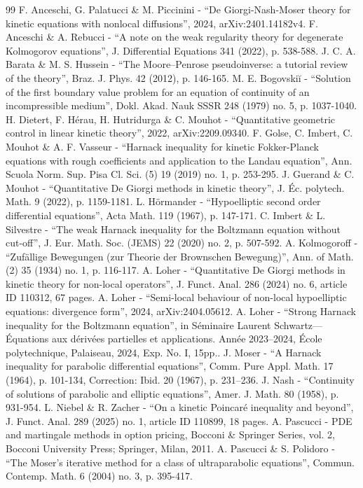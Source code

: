 \documentclass[10pt,a4paper]{amsart}
\theoremstyle{definition}
\begin{document}
\begin{thebibliography}{99}
 F. Anceschi, G. Palatucci \& M. Piccinini - “De Giorgi-Nash-Moser theory for kinetic equations with nonlocal diffusions”, 2024, arXiv:2401.14182v4.
 F. Anceschi \& A. Rebucci - “A note on the weak regularity theory for degenerate Kolmogorov equations”, J. Differential Equations 341 (2022), p. 538-588.
 J. C. A. Barata \& M. S. Hussein - “The Moore–Penrose pseudoinverse: a tutorial review of the theory”, Braz. J. Phys. 42 (2012), p. 146-165.
 M. E. Bogovskiĭ - “Solution of the first boundary value problem for an equation of continuity of an incompressible medium”, Dokl. Akad. Nauk SSSR 248 (1979) no. 5, p. 1037-1040.
 H. Dietert, F. Hérau, H. Hutridurga \& C. Mouhot - “Quantitative geometric control in linear kinetic theory”, 2022, arXiv:2209.09340.
 F. Golse, C. Imbert, C. Mouhot \& A. F. Vasseur - “Harnack inequality for kinetic Fokker-Planck equations with rough coefficients and application to the Landau equation”, Ann. Scuola Norm. Sup. Pisa Cl. Sci. (5) 19 (2019) no. 1, p. 253-295.
 J. Guerand \& C. Mouhot - “Quantitative De Giorgi methods in kinetic theory”, J. Éc. polytech. Math. 9 (2022), p. 1159-1181.
 L. Hörmander - “Hypoelliptic second order differential equations”, Acta Math. 119 (1967), p. 147-171.
 C. Imbert \& L. Silvestre - “The weak Harnack inequality for the Boltzmann equation without cut-off”, J. Eur. Math. Soc. (JEMS) 22 (2020) no. 2, p. 507-592.
 A. Kolmogoroff - “Zufällige Bewegungen (zur Theorie der Brownschen Bewegung)”, Ann. of Math. (2) 35 (1934) no. 1, p. 116-117.
 A. Loher - “Quantitative De Giorgi methods in kinetic theory for non-local operators”, J. Funct. Anal. 286 (2024) no. 6, article ID 110312, 67 pages.
 A. Loher - “Semi-local behaviour of non-local hypoelliptic equations: divergence form”, 2024, arXiv:2404.05612.
 A. Loher - “Strong Harnack inequality for the Boltzmann equation”, in Séminaire Laurent Schwartz—Équations aux dérivées partielles et applications. Année 2023–2024, École polytechnique, Palaiseau, 2024, Exp. No. I, 15pp..
 J. Moser - “A Harnack inequality for parabolic differential equations”, Comm. Pure Appl. Math. 17 (1964), p. 101-134, Correction: Ibid. 20 (1967), p. 231–236.
 J. Nash - “Continuity of solutions of parabolic and elliptic equations”, Amer. J. Math. 80 (1958), p. 931-954.
 L. Niebel \& R. Zacher - “On a kinetic Poincaré inequality and beyond”, J. Funct. Anal. 289 (2025) no. 1, article ID 110899, 18 pages.
 A. Pascucci - PDE and martingale methods in option pricing, Bocconi \& Springer Series, vol. 2, Bocconi University Press; Springer, Milan, 2011.
 A. Pascucci \& S. Polidoro - “The Moser’s iterative method for a class of ultraparabolic equations”, Commun. Contemp. Math. 6 (2004) no. 3, p. 395-417.
\end{thebibliography}
\end{document}

